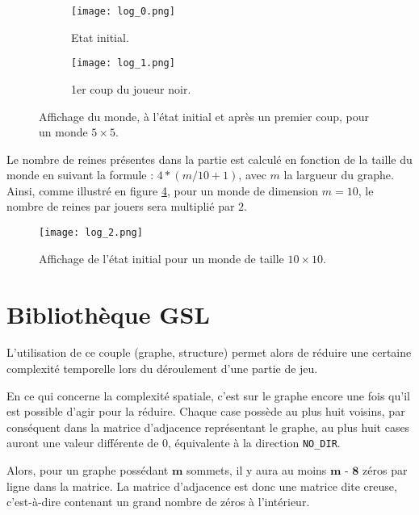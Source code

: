 \medbreak

\begin{figure}[H]
    \centering
    \begin{subfigure}{0.4\textwidth}
        \centering
        \texttt{[image: log\_0.png]}
        \caption{Etat initial.}
        \label{subfig:affichage_etat_initial}
    \end{subfigure}
    \begin{subfigure}{0.52\textwidth}
        \centering
        \texttt{[image: log\_1.png]}
        \caption{1er coup du joueur noir.}
        \label{subfig:affichage_premier_coup}
    \end{subfigure}
    \caption{Affichage du monde, à l'état initial et après un premier coup, pour un monde $5\times5$.}
    \label{fig:affichage_partie}
\end{figure}

Le nombre de reines présentes dans la partie est calculé en fonction de la taille du monde en suivant la formule : $4*(m/10 + 1)$, avec $m$ la largueur du graphe. Ainsi, comme illustré en figure \ref{fig:affichage_taille_10}, pour un monde de dimension $m=10$, le nombre de reines par jouers sera multiplié par $2$.

\begin{figure}[H]
    \centering
    \texttt{[image: log\_2.png]}
    \caption{Affichage de l'état initial pour un monde de taille $10\times10$.}
    \label{fig:affichage_taille_10}
\end{figure}

\section{Bibliothèque GSL}
\label{sec:gsl}

L'utilisation de ce couple (graphe, structure) permet alors de réduire une certaine complexité temporelle lors du déroulement d'une partie de jeu. 

En ce qui concerne la complexité spatiale, c'est sur le graphe encore une fois qu'il est possible d'agir pour la réduire. Chaque case possède au plus huit voisins, par conséquent dans la matrice d'adjacence représentant le graphe, au plus huit cases auront une valeur différente de 0, équivalente à la direction \texttt{NO\_DIR}. 

Alors, pour un graphe possédant $\textbf{m}$ sommets, il y aura au moins $ \textbf{m - 8}$ zéros par ligne dans la matrice. La matrice d'adjacence est donc une matrice dite creuse, c'est-à-dire contenant un grand nombre de zéros à l'intérieur.

